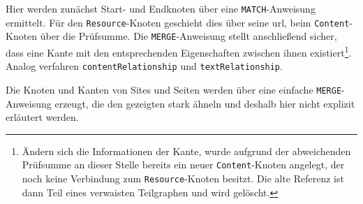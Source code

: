     Hier werden zunächst Start- und Endknoten über eine \texttt{MATCH}-Anweisung ermittelt.
    Für den \texttt{Resource}-Knoten geschieht dies über seine \gls{url},
    beim \texttt{Content}-Knoten über die Prüfsumme.
    Die \texttt{MERGE}-Anweisung stellt anschließend sicher,
    dass eine Kante mit den entsprechenden Eigenschaften zwischen ihnen
    existiert\footnote{Ändern sich die Informationen der Kante, wurde aufgrund der abweichenden
    Prüfsumme an dieser Stelle bereits ein neuer \texttt{Content}-Knoten angelegt,
    der noch keine Verbindung zum \texttt{Resource}-Knoten besitzt.
    Die alte Referenz ist dann Teil eines verwaisten Teilgraphen und wird gelöscht.}.
    Analog verfahren \texttt{contentRelationship} und \texttt{textRelationship}.

    Die Knoten und Kanten von Sites und Seiten werden über eine einfache \texttt{MERGE}-Anweisung erzeugt,
    die den gezeigten stark ähneln und deshalb hier nicht explizit erläutert werden.
